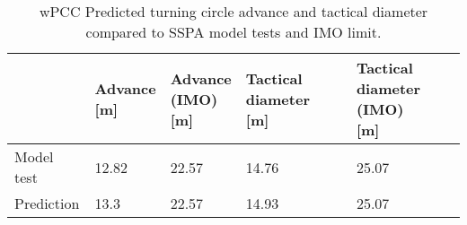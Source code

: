 \begin{table}[!htb]
    \footnotesize
    \caption{wPCC Predicted turning circle advance and tactical diameter compared to SSPA model tests and IMO limit.}
    \label{\detokenize{06.10_results_wpcc:tab-wpcc-advance}}
    \centering
    \begin{tabular*}{\textwidth}{p{2cm} p{1.5cm} p{1.5cm} p{2.5cm} p{2.5cm}}
\toprule
&

\thead{Advance \\ {[}m{]}}
&

\thead{Advance \\ (IMO) \\ {[}m{]}}
&

\thead{Tactical diameter \\ {[}m{]}}
&

\thead{Tactical diameter \\ (IMO) \\ {[}m{]}}
\\
\hline

Model test
&

12.82
&

22.57
&

14.76
&

25.07
\\

Prediction
&

13.3
&

22.57
&

14.93
&

25.07
\\
\bottomrule
\end{tabular*}

\end{table}

